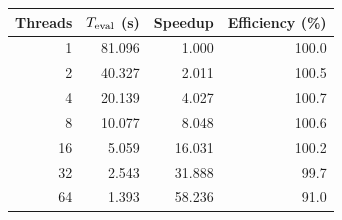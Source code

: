 \begin{tabular}{@{}rrrr@{}}
\toprule
Threads & $T_{\rm eval}$ (s) & Speedup & Efficiency (\%)\\
\midrule
1 & 81.096 & 1.000 & 100.0\\
2 & 40.327 & 2.011 & 100.5\\
4 & 20.139 & 4.027 & 100.7\\
8 & 10.077 & 8.048 & 100.6\\
16 & 5.059 & 16.031 & 100.2\\
32 & 2.543 & 31.888 & 99.7\\
64 & 1.393 & 58.236 & 91.0\\
\bottomrule
\end{tabular}

